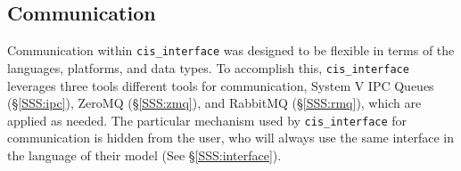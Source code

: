 \documentclass[journal]{IEEEtran}
\newcommand{\cis}{{\tt cis\_interface}{}}
\begin{document}
\subsection{Communication}\label{SS:communication}
%
Communication within {\cis} was designed to be flexible in terms of the 
languages, platforms, and data types. To accomplish this, {\cis} leverages 
three tools different tools for communication, 
System V IPC Queues (\S\ref{SSS:ipc}), ZeroMQ (\S\ref{SSS:zmq}), and RabbitMQ (\S\ref{SSS:rmq}), 
which are applied as needed. The 
particular mechanism used by {\cis} for communication is hidden from the 
user, who will always use the same interface in the language of their model 
(See \S\ref{SSS:interface}). 

\end{document}
